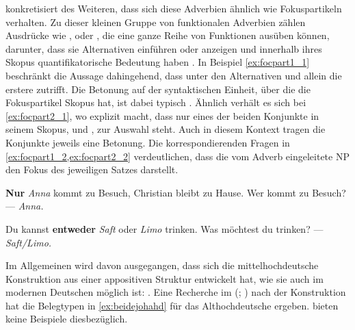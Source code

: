 \citet[425--428]{johannessen2005} konkretisiert des Weiteren, dass sich diese
Adverbien ähnlich wie Fokuspartikeln verhalten. Zu dieser kleinen Gruppe von
funktionalen Adverbien zählen Ausdrücke wie ,  oder
, die eine ganze Reihe von Funktionen ausüben können, darunter, dass
sie Alternativen einführen oder anzeigen und innerhalb ihres Skopus
quantifikatorische Bedeutung haben \autocite[vgl.][1--4, 15]{koenig1991}. In
Beispiel \cref{ex:focpart1_1} beschränkt  die Aussage dahingehend, dass
unter den Alternativen  und  allein die erstere
zutrifft. Die Betonung auf der syntaktischen Einheit, über die die
Fokuspartikel Skopus hat, ist dabei typisch \autocite[10--14]{koenig1991}.
Ähnlich verhält es sich bei \cref{ex:focpart2_1}, wo  explizit
macht, dass nur eines der beiden Konjunkte in seinem Skopus,  und
, zur Auswahl steht. Auch in diesem Kontext tragen die Konjunkte
jeweils eine Betonung. Die korrespondierenden Fragen in
\cref{ex:focpart1_2,ex:focpart2_2} verdeutlichen, dass die vom Adverb
eingeleitete NP den Fokus des jeweiligen Satzes darstellt.

\begin{exe}
\ex\label{ex:focpart_1}
\begin{xlist}
	\ex \label{ex:focpart1_1}
		\textbf{Nur} \emph{Anna} kommt zu Besuch, Christian bleibt zu
		Hause.
	\ex \label{ex:focpart1_2}
		Wer kommt zu Besuch? --- \emph{Anna.}
\end{xlist}

\ex \begin{xlist}
	\ex \label{ex:focpart2_1}
		Du kannst \textbf{entweder} \emph{Saft} oder \emph{Limo} trinken.
	\ex \label{ex:focpart2_2}
		Was möchtest du trinken? --- \emph{Saft/Limo.}
\end{xlist}
\end{exe}

Im Allgemeinen wird davon ausgegangen, dass sich die mittelhochdeutsche
Konstruktion   aus einer
appositiven Struktur entwickelt hat, wie sie auch im modernen Deutschen möglich
ist:  \autocite[vgl.][626--627 und die dortigen
Referenzen]{ksw2}. Eine Recherche im  (;
\nosh\cite{ddd}) nach der Konstruktion   \autocite[vgl.][49]{schuetzeichel2012} hat die Belegtypen in
\cref{ex:beidejohahd} für das Althochdeutsche ergeben.
\citet{braune2018,schrodt2004} bieten keine Beispiele dies\-bezüglich.

